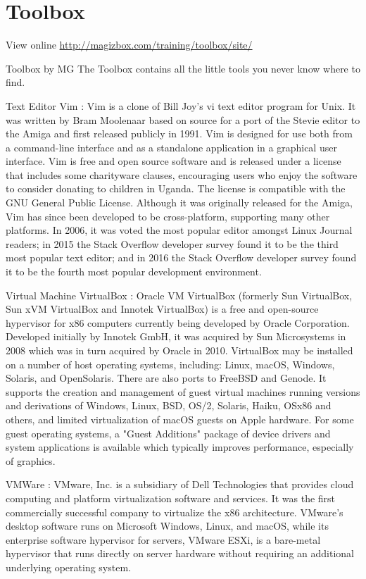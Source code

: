\chapter{Toolbox}

View online \href{http://magizbox.com/training/toolbox/site/}{http://magizbox.com/training/toolbox/site/}

Toolbox by MG
The Toolbox contains all the little tools you never know where to find.

Text Editor
Vim : Vim is a clone of Bill Joy's vi text editor program for Unix. It was written by Bram Moolenaar based on source for a port of the Stevie editor to the Amiga and first released publicly in 1991. Vim is designed for use both from a command-line interface and as a standalone application in a graphical user interface. Vim is free and open source software and is released under a license that includes some charityware clauses, encouraging users who enjoy the software to consider donating to children in Uganda. The license is compatible with the GNU General Public License. Although it was originally released for the Amiga, Vim has since been developed to be cross-platform, supporting many other platforms. In 2006, it was voted the most popular editor amongst Linux Journal readers; in 2015 the Stack Overflow developer survey found it to be the third most popular text editor; and in 2016 the Stack Overflow developer survey found it to be the fourth most popular development environment.

Virtual Machine
VirtualBox : Oracle VM VirtualBox (formerly Sun VirtualBox, Sun xVM VirtualBox and Innotek VirtualBox) is a free and open-source hypervisor for x86 computers currently being developed by Oracle Corporation. Developed initially by Innotek GmbH, it was acquired by Sun Microsystems in 2008 which was in turn acquired by Oracle in 2010. VirtualBox may be installed on a number of host operating systems, including: Linux, macOS, Windows, Solaris, and OpenSolaris. There are also ports to FreeBSD and Genode. It supports the creation and management of guest virtual machines running versions and derivations of Windows, Linux, BSD, OS/2, Solaris, Haiku, OSx86 and others, and limited virtualization of macOS guests on Apple hardware. For some guest operating systems, a "Guest Additions" package of device drivers and system applications is available which typically improves performance, especially of graphics.

VMWare : VMware, Inc. is a subsidiary of Dell Technologies that provides cloud computing and platform virtualization software and services. It was the first commercially successful company to virtualize the x86 architecture. VMware's desktop software runs on Microsoft Windows, Linux, and macOS, while its enterprise software hypervisor for servers, VMware ESXi, is a bare-metal hypervisor that runs directly on server hardware without requiring an additional underlying operating system.

